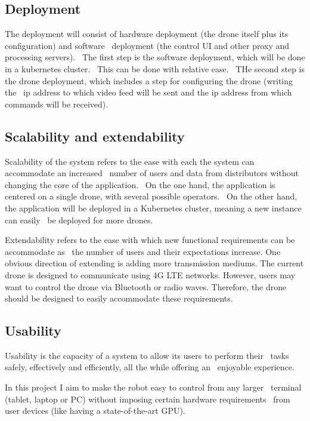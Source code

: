 \subsection{Deployment}
\label{subsec:deployment}
The deployment will consist of hardware deployment (the drone itself plus its configuration) and software \
deployment (the control UI and other proxy and processing servers). \
The first step is the software deployment, which will be done in a kubernetes cluster. \
This can be done with relative ease. \
THe second step is the drone deployment, which includes a step for configuring the drone (writing the \
ip address to which video feed will be sent and the ip address from which commands will be received).

\subsection{Scalability and extendability}
\label{subsec:specification-scalability}
Scalability of the system refers to the ease with each the system can accommodate an increased \
number of users and data from distributors without changing the core of the application. \
On the one hand, the  application is centered on a single drone, with several possible operators. \
On the other hand, the application will be deployed in a Kubernetes cluster, meaning a new instance can easily \
be deployed for more drones.

Extendability refers to the ease with which new functional requirements can be accommodate as \
the number of users and their expectations increase.
One obvious direction of extending is adding more transmission mediums.
The current drone is designed to communicate using 4G LTE networks.
However, users may want to control the drone via Bluetooth or radio waves.
Therefore, the drone should be designed to easily accommodate these requirements.

\subsection{Usability}
\label{subsec:specification-usability}
Usability is the capacity of a system to allow its users to perform their \
tasks safely, effectively and efficiently, all the while offering an \
enjoyable experience.

In this project I aim to make the robot easy to control from any larger \
terminal (tablet, laptop or PC) without imposing certain hardware requirements \
from user devices (like having a state-of-the-art GPU).

